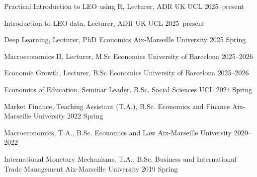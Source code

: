 

\begin{cvhonors}

      
    
  \cvhonor
    {Practical Introduction to LEO using R{\normalfont,}} %
    {Lecturer, ADR UK} %
    {UCL} %
    {2025--present} %
    
  \cvhonor
    {Introduction to LEO data{\normalfont,}} %
    {Lecturer, ADR UK} %
    {UCL} %
    {2025--present} %
    
  \cvhonor
    {Deep Learning{\normalfont,}} %
    {Lecturer, PhD Economics} %
    {Aix-Marseille University} %
    {2025 Spring} %
    
  \cvhonor
    {Macroeconomics II{\normalfont,}} %
    {Lecturer, M.Sc Economics} %
    {University of Barcelona} %
    {2025--2026} %
    
  \cvhonor
    {Economic Growth{\normalfont,}} %
    {Lecturer, B.Sc Economics} %
    {University of Barcelona} %
    {2025--2026} %

  \cvhonor
    {Economics of Education{\normalfont,}} %
    {Seminar Leader, B.Sc. Social Sciences} %
    {UCL} %
    {2024 Spring} %
    
  \cvhonor
    {Market Finance{\normalfont,}} %
    {Teaching Assistant (T.A.), B.Sc. Economics and Finance} %
    {Aix-Marseille University} %
    {2022 Spring} %
    
  \cvhonor
    {Macroeconomics{\normalfont,}} %
    {T.A., B.Sc. Economics and Law}%
    {Aix-Marseille University} %
    {2020--2022} %
    
  \cvhonor
    {International Monetary Mechanisms{\normalfont,}} %
    {T.A., B.Sc. Business and International Trade Management} %
    {Aix-Marseille University} %
    {2019 Spring} %
    

\end{cvhonors}
